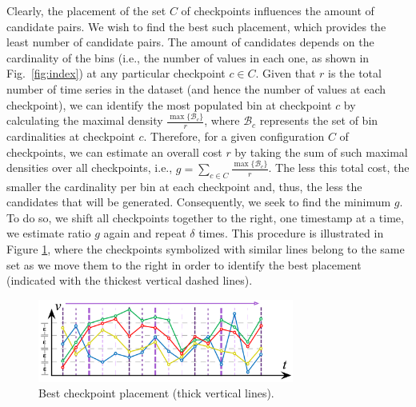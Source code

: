 Clearly, the placement of the set $C$ of checkpoints influences the amount of candidate pairs. We wish to find the best such placement, which provides the least number of candidate pairs. The amount of candidates depends on the cardinality of the bins (i.e., the number of values in each one, as shown in Fig.~\ref{fig:index}) at any particular checkpoint $c \in C$. Given that $r$ is the total number of time series in the dataset (and hence the number of values at each checkpoint), we can identify the most populated bin at checkpoint $c$ by calculating the maximal density $\frac{\max\{\mathcal{B}_{c}\}}{r}$, where $\mathcal{B}_{c}$ represents the set of bin cardinalities at checkpoint $c$. Therefore, for a given configuration $C$ of checkpoints, we can estimate an overall cost $r$ by taking the sum of such maximal densities over all checkpoints, i.e.,  $g=\sum_{c \in C}{\frac{\max\{\mathcal{B}_{c}\}}{r}}$. The less this total cost, the smaller the cardinality per bin at each checkpoint and, thus, the less the candidates that will be generated. Consequently, we seek to find the minimum $g$. To do so, we shift all checkpoints together to the right, one timestamp at a time, we estimate ratio $g$ again and repeat $\delta$ times. This procedure is illustrated in Figure \ref{fig:heuristic1}, where the checkpoints symbolized with similar lines belong to the same set as we move them to the right in order to identify the best placement (indicated with the thickest vertical dashed lines).

\begin{figure}[!tb]
    \centering
    \includegraphics[width=0.75\textwidth]{figures/heuristic.png}
    \caption{Best checkpoint placement (thick vertical lines).}
    \label{fig:heuristic1}
\end{figure}


